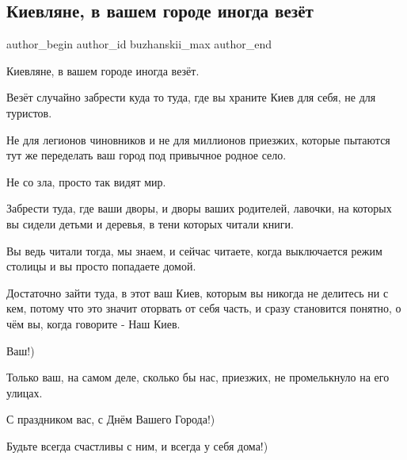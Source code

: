  
 
 
 
 
 
\subsection{Киевляне, в вашем городе иногда везёт}
\label{sec:30_05_2021.fb.buzhanskii_max.1.kievljane_vezenie}
\ifcmt
 author_begin
   author_id buzhanskii_max
 author_end
\fi

Киевляне, в вашем городе иногда везёт.

Везёт случайно забрести куда то туда, где вы храните Киев для себя, не для
туристов.

Не для легионов чиновников и не для миллионов приезжих, которые пытаются тут же
переделать ваш город под привычное родное село.

Не со зла, просто так видят мир.

Забрести туда, где ваши дворы, и дворы ваших родителей, лавочки, на которых вы
сидели детьми и деревья, в тени которых читали книги.

Вы ведь читали тогда, мы знаем, и сейчас читаете, когда выключается режим
столицы и вы просто попадаете домой.

Достаточно зайти туда, в этот ваш Киев, которым вы никогда не делитесь ни с
кем, потому что это значит оторвать от себя часть, и сразу становится понятно,
о чём вы, когда говорите - Наш Киев.

Ваш!)

Только ваш, на самом деле, сколько бы нас, приезжих, не промелькнуло на его улицах.

С праздником вас, с Днём Вашего Города!)

Будьте всегда счастливы с ним, и всегда у себя дома!)

